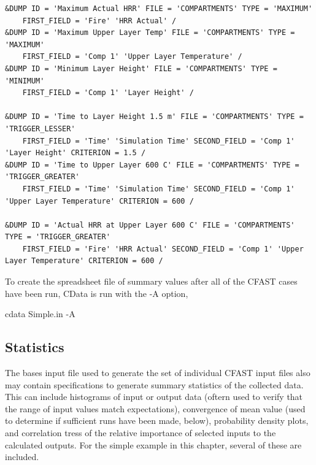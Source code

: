 \documentclass[12pt,twoside]{book}
\begin{document}
\begin{lstlisting}[basicstyle=\scriptsize]
&DUMP ID = 'Maximum Actual HRR' FILE = 'COMPARTMENTS' TYPE = 'MAXIMUM'
    FIRST_FIELD = 'Fire' 'HRR Actual' /
&DUMP ID = 'Maximum Upper Layer Temp' FILE = 'COMPARTMENTS' TYPE = 'MAXIMUM'
    FIRST_FIELD = 'Comp 1' 'Upper Layer Temperature' /
&DUMP ID = 'Minimum Layer Height' FILE = 'COMPARTMENTS' TYPE = 'MINIMUM'
    FIRST_FIELD = 'Comp 1' 'Layer Height' /
    
&DUMP ID = 'Time to Layer Height 1.5 m' FILE = 'COMPARTMENTS' TYPE = 'TRIGGER_LESSER'
    FIRST_FIELD = 'Time' 'Simulation Time' SECOND_FIELD = 'Comp 1' 'Layer Height' CRITERION = 1.5 /
&DUMP ID = 'Time to Upper Layer 600 C' FILE = 'COMPARTMENTS' TYPE = 'TRIGGER_GREATER'
    FIRST_FIELD = 'Time' 'Simulation Time' SECOND_FIELD = 'Comp 1' 'Upper Layer Temperature' CRITERION = 600 /
    
&DUMP ID = 'Actual HRR at Upper Layer 600 C' FILE = 'COMPARTMENTS' TYPE = 'TRIGGER_GREATER'
    FIRST_FIELD = 'Fire' 'HRR Actual' SECOND_FIELD = 'Comp 1' 'Upper Layer Temperature' CRITERION = 600 /
\end{lstlisting}

To create the spreadsheet file of summary values after all of the CFAST cases have been run, CData is run with the {\ct -A} option,

\vspace{\baselineskip}
{\ct cdata Simple.in -A}

\subsection{Statistics}

The bases input file used to generate the set of individual CFAST input files also may contain specifications to generate summary statistics of the collected data. This can include histograms of input or output data (oftern used to verify that the range of input values match expectations), convergence of mean value (used to determine if sufficient runs have been made, below), probability density plots, and correlation tress of the relative importance of selected inputs to the calculated outputs. For the simple example in this chapter, several of these are included.
\end{document}
